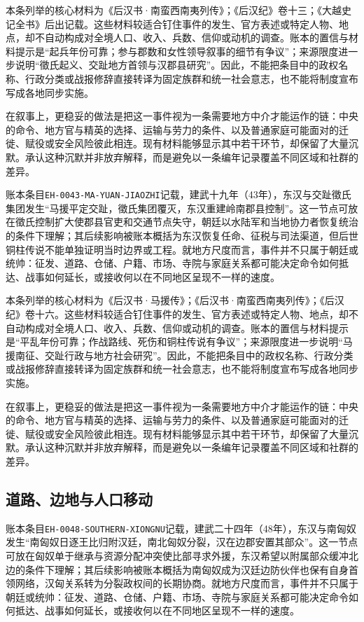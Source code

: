 本条列举的核心材料为《后汉书·南蛮西南夷列传》；《后汉纪》卷十三；《大越史记全书》后出记载。这些材料较适合钉住事件的发生、官方表述或特定人物、地点，却不自动构成对全境人口、收入、兵数、信仰或动机的调查。账本的置信与材料提示是“起兵年份可靠；参与郡数和女性领导叙事的细节有争议”；来源限度进一步说明“徵氏起义、交趾地方首领与汉郡县研究”。因此，不能把条目中的政权名称、行政分类或战报修辞直接转译为固定族群和统一社会意志，也不能将制度宣布写成各地同步实施。

在叙事上，更稳妥的做法是把这一事件视为一条需要地方中介才能运作的链：中央的命令、地方官与精英的选择、运输与劳力的条件、以及普通家庭可能面对的迁徙、赋役或安全风险彼此相连。现有材料能够显示其中若干环节，却保留了大量沉默。承认这种沉默并非放弃解释，而是避免以一条编年记录覆盖不同区域和社群的差异。

账本条目\texttt{EH-0043-MA-YUAN-JIAOZHI}记载，建武十九年（43年），东汉与交趾徵氏集团发生“马援平定交趾，徵氏集团覆灭，东汉重建岭南郡县控制”。这一节点可放在徵氏控制扩大使郡县官吏和交通节点失守，朝廷以水陆军和当地协力者恢复统治的条件下理解；其后续影响被账本概括为东汉恢复任命、征税与司法渠道，但后世铜柱传说不能单独证明当时边界或工程。就地方尺度而言，事件并不只属于朝廷或统帅：征发、道路、仓储、户籍、市场、寺院与家庭关系都可能决定命令如何抵达、战事如何延长，或接收何以在不同地区呈现不一样的速度。

本条列举的核心材料为《后汉书·马援传》；《后汉书·南蛮西南夷列传》；《后汉纪》卷十六。这些材料较适合钉住事件的发生、官方表述或特定人物、地点，却不自动构成对全境人口、收入、兵数、信仰或动机的调查。账本的置信与材料提示是“平乱年份可靠；作战路线、死伤和铜柱传说有争议”；来源限度进一步说明“马援南征、交趾行政与地方社会研究”。因此，不能把条目中的政权名称、行政分类或战报修辞直接转译为固定族群和统一社会意志，也不能将制度宣布写成各地同步实施。

在叙事上，更稳妥的做法是把这一事件视为一条需要地方中介才能运作的链：中央的命令、地方官与精英的选择、运输与劳力的条件、以及普通家庭可能面对的迁徙、赋役或安全风险彼此相连。现有材料能够显示其中若干环节，却保留了大量沉默。承认这种沉默并非放弃解释，而是避免以一条编年记录覆盖不同区域和社群的差异。

\subsection{道路、边地与人口移动}

账本条目\texttt{EH-0048-SOUTHERN-XIONGNU}记载，建武二十四年（48年），东汉与南匈奴发生“南匈奴日逐王比归附汉廷，南北匈奴分裂，汉在边郡安置其部众”。这一节点可放在匈奴单于继承与资源分配冲突使比部寻求外援，东汉希望以附属部众缓冲北边的条件下理解；其后续影响被账本概括为南匈奴成为汉廷边防伙伴也保有自身首领网络，汉匈关系转为分裂政权间的长期协商。就地方尺度而言，事件并不只属于朝廷或统帅：征发、道路、仓储、户籍、市场、寺院与家庭关系都可能决定命令如何抵达、战事如何延长，或接收何以在不同地区呈现不一样的速度。

